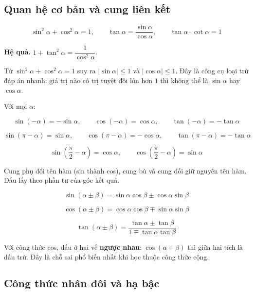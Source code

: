 \documentclass[11pt, a4paper]{article}
\begin{document}
\subsection{Quan hệ cơ bản và cung liên kết}

\begin{dinhly}
$$\sin^2\alpha + \cos^2\alpha = 1, \qquad \tan\alpha = \frac{\sin\alpha}{\cos\alpha}, \qquad \tan\alpha \cdot \cot\alpha = 1$$

\textbf{Hệ quả.} $1 + \tan^2\alpha = \dfrac{1}{\cos^2\alpha}$.

 Từ $\sin^2\alpha + \cos^2\alpha = 1$ suy ra $|\sin\alpha| \le 1$ và $|\cos\alpha| \le 1$. Đây là công cụ loại trừ đáp án nhanh: giá trị nào có trị tuyệt đối lớn hơn $1$ thì không thể là $\sin\alpha$ hay $\cos\alpha$.
\end{dinhly}
\begin{dinhly}
Với mọi $\alpha$:

$$\sin(-\alpha) = -\sin\alpha, \qquad \cos(-\alpha) = \cos\alpha, \qquad \tan(-\alpha) = -\tan\alpha$$

$$\sin(\pi - \alpha) = \sin\alpha, \qquad \cos(\pi - \alpha) = -\cos\alpha, \qquad \tan(\pi - \alpha) = -\tan\alpha$$

$$\sin\!\left(\frac{\pi}{2} - \alpha\right) = \cos\alpha, \qquad \cos\!\left(\frac{\pi}{2} - \alpha\right) = \sin\alpha$$

 Cung phụ đổi tên hàm (sin thành cos), cung bù và cung đối giữ nguyên tên hàm. Dấu lấy theo phần tư của góc kết quả.
\end{dinhly}
\begin{dinhly}
$$\sin(\alpha \pm \beta) = \sin\alpha\cos\beta \pm \cos\alpha\sin\beta$$

$$\cos(\alpha \pm \beta) = \cos\alpha\cos\beta \mp \sin\alpha\sin\beta$$

$$\tan(\alpha \pm \beta) = \frac{\tan\alpha \pm \tan\beta}{1 \mp \tan\alpha\tan\beta}$$

 Với công thức cos, dấu ở hai vế \textbf{ngược nhau}: $\cos(\alpha + \beta)$ thì giữa hai tích là dấu trừ. Đây là chỗ sai phổ biến nhất khi học thuộc công thức cộng.
\end{dinhly}
\subsection{Công thức nhân đôi và hạ bậc}
\end{document}
